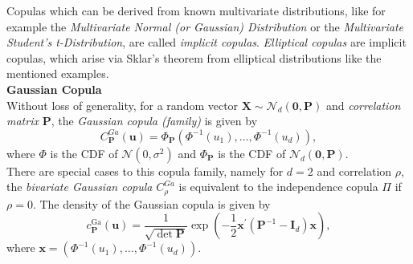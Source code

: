 
Copulas which can be derived from known multivariate distributions, like for example the \textit{Multivariate Normal (or Gaussian) Distribution} or the \textit{Multivariate Student's t-Distribution}, are called \textit{implicit copulas}. \textit{Elliptical copulas} are implicit copulas, which arise via Sklar's theorem from elliptical distributions like the mentioned examples.\\

\textbf{Gaussian Copula}\\
Without loss of generality, for a random vector $\bm{X} \sim {\mathcal{N}_{d}(\bm{0}, \mathbf{P})} $ and \textit{correlation matrix} $\bm{P}$,
the \textit{Gaussian copula (family)} is given by
\begin{equation}
C_{\mathbf{P}}^{G a}(\mathbf{u})=\Phi_{\mathbf{P}}\left(\Phi^{-1}\left(u_{1}\right), \ldots, \Phi^{-1}\left(u_{d}\right)\right),
\end{equation}
where $\Phi$ is the \ac{CDF} of $\mathcal{N}(0, \sigma^{2})$ and 
$\Phi_{\bm{P}}$ is the \ac{CDF} of $\mathcal{N}_{d}(\bm{0}, \mathbf{P})$.\\
There are special cases to this copula family, namely for $d=2$ and correlation $\rho$, the \textit{bivariate Gaussian copula} $C_{\rho}^{G a}$ is equivalent to the independence copula $\Pi$ if $\rho = 0$.
The density of the Gaussian copula is given by
\begin{equation}
c_{\bm{P}}^{\mathrm{Ga}}(\boldsymbol{u})=\frac{1}{\sqrt{\operatorname{det} \bm{P}}} \exp \left(-\frac{1}{2} \boldsymbol{x}^{\prime}\left(\bm{P}^{-1}-\bm{I}_{d}\right) \boldsymbol{x}\right),
\end{equation}
where $\bm{x} = \left(\Phi^{-1}\left(u_{1}\right), \ldots, \Phi^{-1}\left(u_{d}\right)\right)$.
\\

